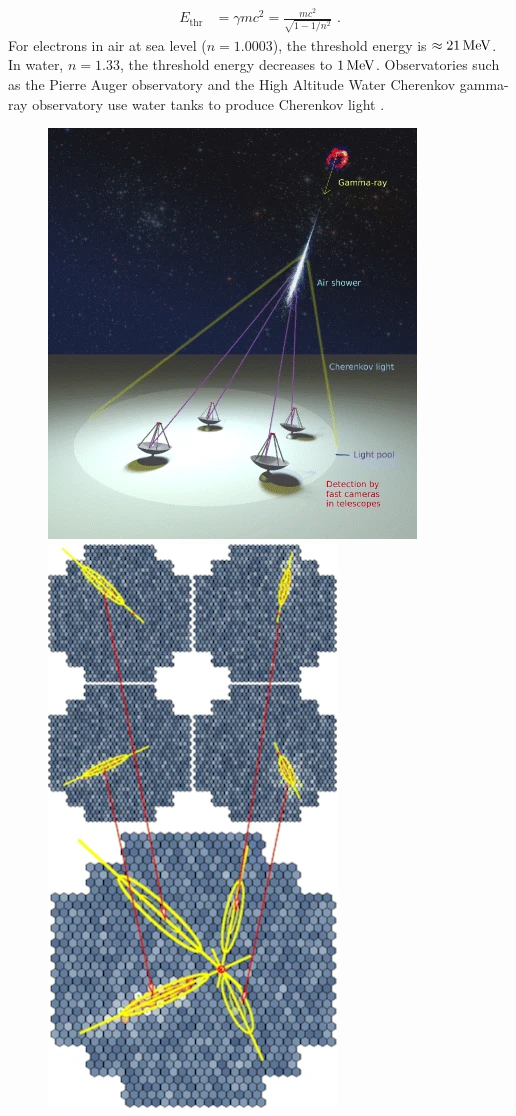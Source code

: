 \begin{equation}
    \begin{aligned}
    E_\text{thr}&=\gamma mc^2=\frac{mc^2}{\sqrt{1-{1}/{n^2}}}\text{ .}
    \end{aligned}
\end{equation}
\noindent For electrons in air at sea level ($n=1.0003$), the threshold energy is $\approx 21\,\si{\mega\electronvolt}$. In water, $n=1.33$, the threshold energy decreases to $1\,\si{\mega\electronvolt}$. Observatories such as the Pierre Auger observatory and the High Altitude Water Cherenkov gamma-ray observatory use water tanks to produce Cherenkov light \citep{alma9924446790001811}.

\begin{figure}[h]
    \centering
    \includegraphics[height=0.4\textheight]{05_Astronomy/Images/air_shower/chenkov_light_pool.png}
    \includegraphics[height=0.4\textheight]{05_Astronomy/Images/air_shower/cherenkov_telescope.png}

\end{figure}
